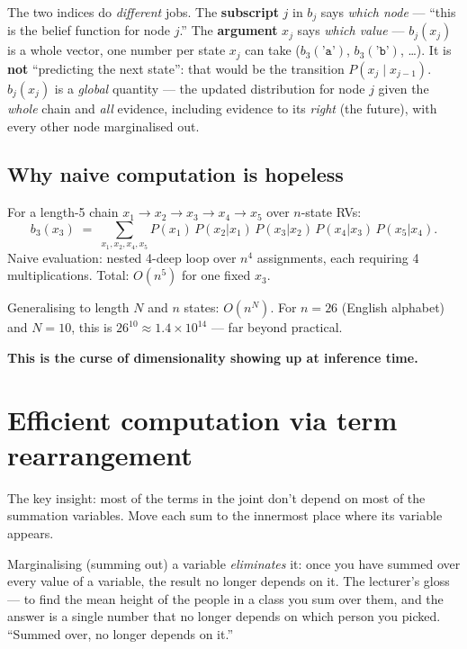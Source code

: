 \documentclass[11pt, a4paper]{article}
\begin{document}
\begin{notebox}
The two indices do \emph{different} jobs. The \textbf{subscript} $j$ in $b_j$ says \emph{which node}
— ``this is the belief function for node $j$.'' The \textbf{argument} $x_j$ says \emph{which value}
— $b_j(x_j)$ is a whole vector, one number per state $x_j$ can take ($b_3(\texttt{'a'})$,
$b_3(\texttt{'b'})$, \dots). It is \textbf{not} ``predicting the next state'': that would be the
transition $P(x_j\mid x_{j-1})$. $b_j(x_j)$ is a \emph{global} quantity — the updated distribution
for node $j$ given the \emph{whole} chain and \emph{all} evidence, including evidence to its
\emph{right} (the future), with every other node marginalised out.
\end{notebox}

\subsection{Why naive computation is hopeless}

For a length-5 chain $x_1 \to x_2 \to x_3 \to x_4 \to x_5$ over $n$-state RVs:
\[
b_3(x_3) \;=\; \sum_{x_1, x_2, x_4, x_5} P(x_1)\,P(x_2|x_1)\,P(x_3|x_2)\,P(x_4|x_3)\,P(x_5|x_4).
\]
Naive evaluation: nested 4-deep loop over $n^4$ assignments, each requiring 4 multiplications. Total: $O(n^5)$ for one fixed $x_3$.

Generalising to length $N$ and $n$ states: $O(n^N)$. For $n = 26$ (English alphabet) and $N = 10$, this is $26^{10} \approx 1.4 \times 10^{14}$ — far beyond practical.

\textbf{This is the curse of dimensionality showing up at inference time.}

\section{Efficient computation via term rearrangement}

The key insight: most of the terms in the joint don't depend on most of the summation variables. Move each sum to the innermost place where its variable appears.

\begin{notebox}
Marginalising (summing out) a variable \emph{eliminates} it: once you have summed over every value of a variable, the result no longer depends on it. The lecturer's gloss — to find the mean height of the people in a class you sum over them, and the answer is a single number that no longer depends on which person you picked. ``Summed over, no longer depends on it.''
\end{notebox}
\end{document}

